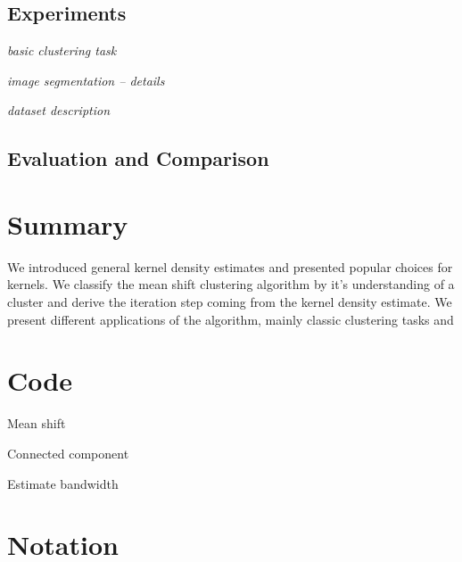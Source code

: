 \documentclass{article}
\begin{document}
\subsection{Experiments}

\textit{basic clustering task}

\textit{image segmentation -- details}

\textit{dataset description}

\cite{Alpert.2012}

\subsection{Evaluation and Comparison}

\section{Summary}

We introduced general kernel density estimates and presented popular choices for kernels. We classify the mean shift clustering algorithm by it's understanding of a cluster and derive the iteration step coming from the kernel density estimate. We present different applications of the algorithm, mainly classic clustering tasks and 






\appendix


\section{Code}

\begin{code}
	
	\caption[mean\_shift]{Mean shift}
	\label{code:mean_shift}
\end{code}

\begin{code}
	
	\caption[connected\_component]{Connected component}
	\label{code:connected_component}
\end{code}

\begin{code}
	
	\caption[estimate\_bandwidth]{Estimate bandwidth}
	\label{code:estimate_bandwidth}
\end{code}


\section{Notation}
\end{document}

